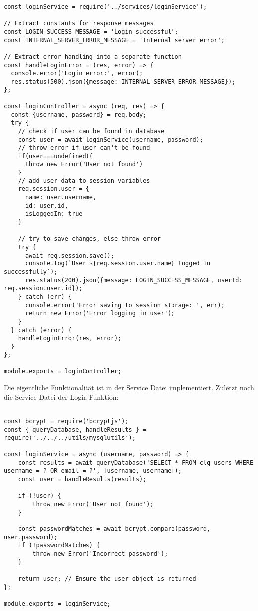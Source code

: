 \begin{lstlisting}[label={lst:lst-login-controller}]
const loginService = require('../services/loginService');

// Extract constants for response messages
const LOGIN_SUCCESS_MESSAGE = 'Login successful';
const INTERNAL_SERVER_ERROR_MESSAGE = 'Internal server error';

// Extract error handling into a separate function
const handleLoginError = (res, error) => {
  console.error('Login error:', error);
  res.status(500).json({message: INTERNAL_SERVER_ERROR_MESSAGE});
};

const loginController = async (req, res) => {
  const {username, password} = req.body;
  try {
    // check if user can be found in database
    const user = await loginService(username, password);
    // throw error if user can't be found
    if(user===undefined){
      throw new Error('User not found')
    }
    // add user data to session variables
    req.session.user = {
      name: user.username,
      id: user.id,
      isLoggedIn: true
    }

    // try to save changes, else throw error
    try {
      await req.session.save();
      console.log(`User ${req.session.user.name} logged in successfully`);
      res.status(200).json({message: LOGIN_SUCCESS_MESSAGE, userId: req.session.user.id});
    } catch (err) {
      console.error('Error saving to session storage: ', err);
      return new Error('Error logging in user');
    }
  } catch (error) {
    handleLoginError(res, error);
  }
};

module.exports = loginController;
\end{lstlisting}

Die eigentliche Funktionalität ist in der Service Datei implementiert.
Zuletzt noch die Service Datei der Login Funktion:

\begin{lstlisting}[label={lst:lst-login-service}]

const bcrypt = require('bcryptjs');
const { queryDatabase, handleResults } = require('../../../utils/mysqlUtils');

const loginService = async (username, password) => {
    const results = await queryDatabase('SELECT * FROM clq_users WHERE username = ? OR email = ?', [username, username]);
    const user = handleResults(results);

    if (!user) {
        throw new Error('User not found');
    }

    const passwordMatches = await bcrypt.compare(password, user.password);
    if (!passwordMatches) {
        throw new Error('Incorrect password');
    }

    return user; // Ensure the user object is returned
};

module.exports = loginService;
\end{lstlisting}


